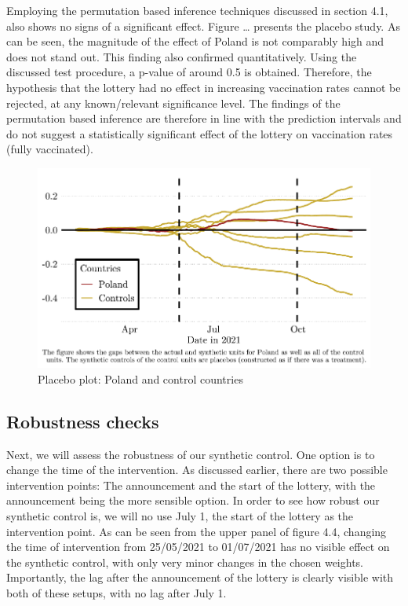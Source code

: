 \documentclass{scrbook}
\begin{document}
Employing the permutation based inference techniques discussed in
section 4.1, also shows no signs of a significant effect. Figure
\ldots{} presents the placebo study. As can be seen, the magnitude of
the effect of Poland is not comparably high and does not stand out. This
finding also confirmed quantitatively. Using the discussed test
procedure, a p-value of around 0.5 is obtained. Therefore, the
hypothesis that the lottery had no effect in increasing vaccination
rates cannot be rejected, at any known/relevant significance level. The
findings of the permutation based inference are therefore in line with
the prediction intervals and do not suggest a statistically significant
effect of the lottery on vaccination rates (fully vaccinated).

\begin{figure}[h]
\caption{Placebo plot: Poland and control countries}

\begin{center}\includegraphics{bachelor_thesis_files/figure-latex/unnamed-chunk-4-1} \end{center}
\end{figure}

\subsection*{Robustness checks}

Next, we will assess the robustness of our synthetic control. One option
is to change the time of the intervention. As discussed earlier, there
are two possible intervention points: The announcement and the start of
the lottery, with the announcement being the more sensible option. In
order to see how robust our synthetic control is, we will no use July 1,
the start of the lottery as the intervention point. As can be seen from
the upper panel of figure 4.4, changing the time of intervention from
25/05/2021 to 01/07/2021 has no visible effect on the synthetic control,
with only very minor changes in the chosen weights. Importantly, the lag
after the announcement of the lottery is clearly visible with both of
these setups, with no lag after July 1.
\end{document}
